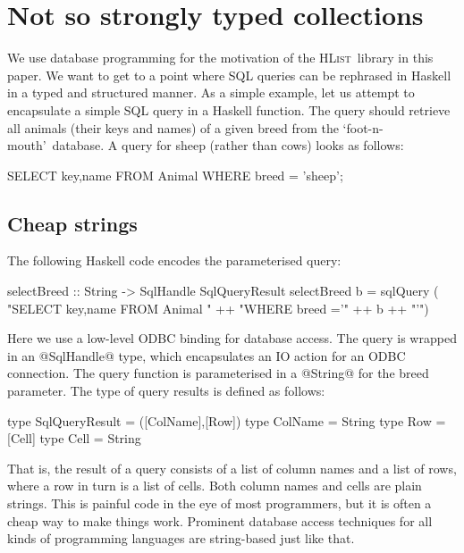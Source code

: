 \documentclass[nocopyrightspace,preprint]{sigplan-proc}
\newcommand{\hwVsTr}[2]{#2}
\newcommand{\HList}{\textsc{HList}}
\newcommand{\fm}{`foot-n-mouth'}
\begin{document}
\hwVsTr{}{\newpage}

\section{Not so strongly typed collections}
\label{S:weak}

We use database programming for the motivation of the \HList\ library
in this paper. We want to get to a point where SQL queries can be
rephrased in Haskell in a typed and structured manner. As a simple
example, let us attempt to encapsulate a simple SQL query in a Haskell
function. The query should retrieve all animals (their keys and names)
of a given breed from the \fm\ database. A query for sheep (rather
than cows) looks as follows:

\begin{code}
 SELECT key,name FROM Animal WHERE breed = 'sheep';
\end{code}

\medskip

\subsection*{Cheap strings}

The following Haskell code encodes the parameterised query:

\begin{code}
 selectBreed :: String -> SqlHandle SqlQueryResult 
 selectBreed b =
   sqlQuery (  "SELECT key,name FROM Animal "
            ++ "WHERE breed ='" ++ b ++ "'")
\end{code}

Here we use a low-level ODBC binding for database access. The query is
wrapped in an @SqlHandle@ type, which encapsulates an IO action for an
ODBC connection. The query function is parameterised in a @String@ for
the breed parameter. The type of query results is defined as follows:

\begin{code}
 type SqlQueryResult = ([ColName],[Row])
 type ColName        = String
 type Row            = [Cell]
 type Cell           = String
\end{code}

That is, the result of a query consists of a list of column names and
a list of rows, where a row in turn is a list of cells. Both column
names and cells are plain strings. This is painful code in the eye of
most programmers, but it is often a cheap way to make things
work. Prominent database access techniques for all kinds of
programming languages are string-based just like that.
\end{document}
